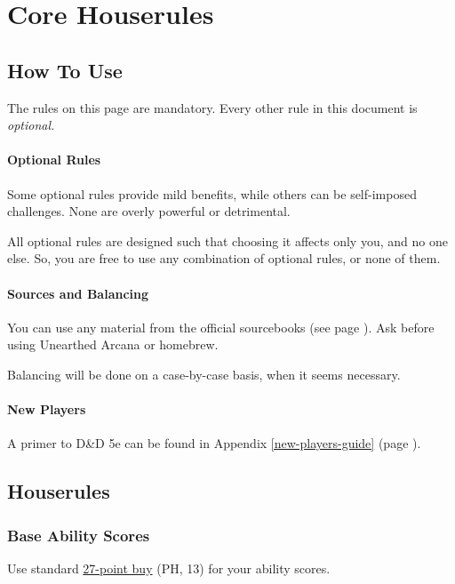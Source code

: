 \documentclass[letterpaper,twocolumn,openany,nodeprecatedcode,bg=print]{dndbook}
\newcommand{\pg}[1]{page \pageref{#1}}
\newcommand{\see}[1]{(see \pg{#1})}
\begin{document}




\chapter{Core Houserules}

\noindent [Version 7.6.1]

\section{How To Use}
The rules on this page are mandatory. Every other rule in this document is \textit{optional.} 

\subsubsection{Optional Rules}
Some optional rules provide mild benefits, while others can be self-imposed challenges. None are overly powerful or detrimental. 

All optional rules are designed such that choosing it affects only you, and no one else. So, you are free to use any combination of optional rules, or none of them.

\subsubsection{Sources and Balancing}
You can use any material from the official sourcebooks \see{sources}. Ask before using Unearthed Arcana or homebrew.

Balancing will be done on a case-by-case basis, when it seems necessary. 

\subsubsection{New Players}
A primer to D\&D 5e can be found in Appendix \ref{new-players-guide} (\pg{new-players-guide}).

\newpage
\section{Houserules}

\subsection{Base Ability Scores}
Use standard \href{https://chicken-dinner.com/5e/5e-point-buy.html}{27-point buy} (PH, 13) for your ability scores. 
\end{document}

